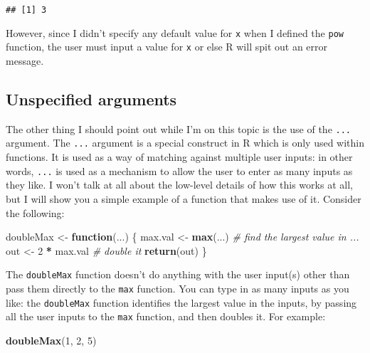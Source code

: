 \documentclass[]{book}
\newenvironment{Shaded}{\begin{snugshade}}{\end{snugshade}}
\newcommand{\CommentTok}[1]{\textcolor[rgb]{0.56,0.35,0.01}{\textit{#1}}}
\newcommand{\ControlFlowTok}[1]{\textcolor[rgb]{0.13,0.29,0.53}{\textbf{#1}}}
\newcommand{\DecValTok}[1]{\textcolor[rgb]{0.00,0.00,0.81}{#1}}
\newcommand{\KeywordTok}[1]{\textcolor[rgb]{0.13,0.29,0.53}{\textbf{#1}}}
\newcommand{\NormalTok}[1]{#1}
\newcommand{\OperatorTok}[1]{\textcolor[rgb]{0.81,0.36,0.00}{\textbf{#1}}}
\newcommand{\StringTok}[1]{\textcolor[rgb]{0.31,0.60,0.02}{#1}}
\begin{document}
\begin{verbatim}
## [1] 3
\end{verbatim}

However, since I didn't specify any default value for \texttt{x} when I defined the \texttt{pow} function, the user must input a value for \texttt{x} or else R will spit out an error message.

\hypertarget{unspecified-arguments}{%
\subsection{Unspecified arguments}\label{unspecified-arguments}}

The other thing I should point out while I'm on this topic is the use of the \texttt{...} argument. The \texttt{...} argument is a special construct in R which is only used within functions. It is used as a way of matching against multiple user inputs: in other words, \texttt{...} is used as a mechanism to allow the user to enter as many inputs as they like. I won't talk at all about the low-level details of how this works at all, but I will show you a simple example of a function that makes use of it. Consider the following:

\begin{Shaded}
\begin{Highlighting}[]
\NormalTok{doubleMax <-}\StringTok{ }\ControlFlowTok{function}\NormalTok{(...) \{}
\NormalTok{  max.val <-}\StringTok{ }\KeywordTok{max}\NormalTok{(...)  }\CommentTok{# find the largest value in ...}
\NormalTok{  out <-}\StringTok{ }\DecValTok{2} \OperatorTok{*}\StringTok{ }\NormalTok{max.val   }\CommentTok{# double it}
  \KeywordTok{return}\NormalTok{(out)}
\NormalTok{\}}
\end{Highlighting}
\end{Shaded}

The \texttt{doubleMax} function doesn't do anything with the user input(s) other than pass them directly to the \texttt{max} function. You can type in as many inputs as you like: the \texttt{doubleMax} function identifies the largest value in the inputs, by passing all the user inputs to the \texttt{max} function, and then doubles it. For example:

\begin{Shaded}
\begin{Highlighting}[]
\KeywordTok{doubleMax}\NormalTok{(}\DecValTok{1}\NormalTok{, }\DecValTok{2}\NormalTok{, }\DecValTok{5}\NormalTok{)}
\end{Highlighting}
\end{Shaded}
\end{document}
